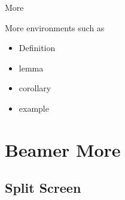 \begin{frame}{More}

    More environments such as

    \begin{itemize}
        \item Definition
        \item lemma
        \item corollary
        \item example
    \end{itemize}
    
\end{frame}

\section{Beamer More}

\subsection{Split Screen}

